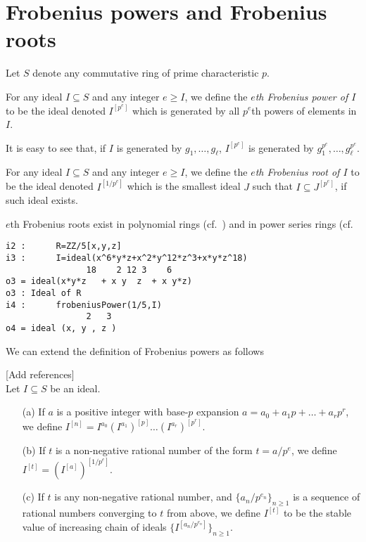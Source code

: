 \documentclass[11pt]{amsart}
\begin{document}
\section{Frobenius powers and Frobenius roots}


Let $S$ denote any commutative ring of prime characteristic $p$.

\begin{definition}
For any ideal $I\subseteq S$ and any integer $e\geq I$, we define the \emph{$e$th Frobenius power of $I$} to be the ideal denoted $I^{[p^e]}$ which is
generated by all $p^e$th powers of elements in $I$.
\end{definition}

It is easy to see that, if $I$ is generated by $g_1, \dots, g_\ell$, $I^{[p^e]}$ is generated by $g_1^{p^e}, \dots, g_\ell^{p^e}$.


\begin{definition}
For any ideal $I\subseteq S$ and any integer $e\geq I$, we define the \emph{$e$th Frobenius root of $I$} to be the ideal denoted $I^{[1/p^{e}]}$ which is
the smallest ideal $J$ such that $I\subseteq J^{[p^e]}$, if such ideal exists.
\end{definition}

$e$th Frobenius roots exist in polynomial rings (cf.~\cite[\S 2]{BlickleMustataSmithDiscretenessAndRationalityOfFThresholds}) and in power series rings (cf.~\cite[\S 5]{KatzmanParameterTestIdealOfCMRings}


\begin{verbatim}
i2 :      R=ZZ/5[x,y,z]
i3 :      I=ideal(x^6*y*z+x^2*y^12*z^3+x*y*z^18)
                18    2 12 3    6
o3 = ideal(x*y*z   + x y  z  + x y*z)
o3 : Ideal of R
i4 :      frobeniusPower(1/5,I)
                2   3
o4 = ideal (x, y , z )
\end{verbatim}

We can extend the definition of Frobenius powers as follows
\begin{definition}{\hfill\large\color{red} [Add references]}\\
Let  $I\subseteq S$ be an ideal.
\begin{enumerate}
 \item[(a)] If $a$ is a positive integer with base-$p$ expansion  $a=a_0 + a_1 p +  \dots + a_r p^r$, we define 
 $I^{[n]}=I^{a_0} \left(I^{a_1}\right)^{[p]} \dots  (I^{a_r})^{[p^r]}$. %
 \item[(b)] If $t$ is a non-negative rational number of the form $t = a/p^e$, we define  $I^{[t]} = (I^{[a]})^{[1/p^e]}.$
 \item[(c)] If $t$ is any non-negative rational number, and $\{a_n/p^{e_n}\}_{n\geq 1}$ is a sequence of rational numbers converging to $t$ from above, we define $I^{[t]}$
 to be the stable value of increasing chain of ideals $\{I^{[a_n/p^{e_n}]}\}_{n\geq 1}$.

\end{enumerate}
\end{definition}
\end{document}

